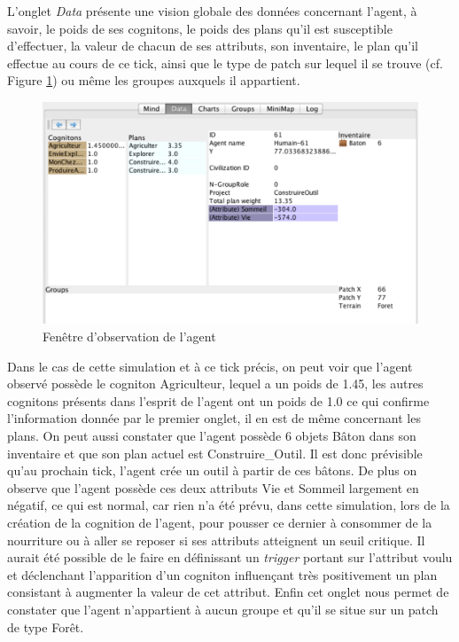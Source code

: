 L'onglet \textit{Data }présente une vision globale des données concernant l'agent, à savoir, le poids de ses cognitons, le poids des plans qu'il est susceptible d'effectuer, la valeur de chacun de ses attributs, son inventaire, le plan qu'il effectue au cours de ce tick, ainsi que le type de patch sur lequel il se trouve (cf. Figure \ref{observe2}) ou même les groupes auxquels il appartient.

\begin{figure}[!ht]
\begin{center}
\includegraphics[scale=0.5]{DocumentationSimulation/observe2.pdf}
\caption[observe]{Fenêtre d'observation de l'agent \\}
\label{observe2}
\end{center}
\end{figure} 

Dans le cas de cette simulation et à ce tick précis, on peut voir que l'agent observé possède le cogniton Agriculteur, lequel a un poids de 1.45, les autres cognitons présents dans l'esprit de l'agent ont un poids de 1.0 ce qui confirme l'information donnée par le premier onglet, il en est de même concernant les plans. On peut aussi constater que l'agent possède 6 objets Bâton dans son inventaire et que son plan actuel est Construire\_Outil. Il est donc prévisible qu'au prochain tick, l'agent crée un outil à partir de ces bâtons. De plus on observe que l'agent possède ces deux attributs Vie et Sommeil largement en négatif, ce qui est normal, car rien n'a été  prévu, dans cette simulation, lors de la création de la cognition de l'agent, pour pousser ce dernier à consommer de la nourriture ou à aller se reposer si ses attributs atteignent un seuil critique. Il aurait été possible de le faire en définissant un \textit{trigger } portant sur l'attribut voulu et déclenchant l'apparition d'un cogniton influençant très positivement un plan consistant à augmenter la valeur de cet attribut. Enfin cet onglet nous permet de constater que l'agent n'appartient à aucun groupe et qu'il se situe sur un patch de type Forêt.

